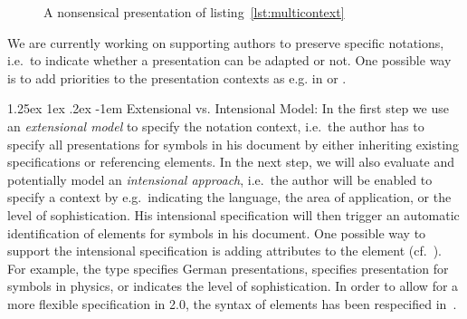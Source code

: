 \documentclass[pdftex,bibtotocnumbered,idxtotoc,11pt]{scrartcl}
\makeatletter
\renewcommand\paragraph{\@startsection{paragraph}{4}{\z@}%
{1.25ex \@plus1ex \@minus.2ex}%
{-1em}%
{\setlength{\parfillskip}{\z@ \@plus 1fil}%
\raggedsection\normalfont\sectfont\nobreak
\size@paragraph\nobreak}}
\makeatother
\begin{document}
\begin{figure}[ht]
\begin{center}
\caption{A nonsensical presentation of listing~\ref{lst:multicontext}}
\end{center}
\end{figure}
\vspace*{-.5cm} We are currently working on supporting authors to preserve specific
notations, i.e.\ to indicate whether a presentation can be adapted or not. One possible
way is to add priorities to the presentation contexts as e.g. in {\css} or {\xslt}.


\paragraph{Extensional vs. Intensional Model:} In the first step we use an
{\emph{extensional model}} to specify the notation context, i.e.\ the author has to
specify all presentations for symbols in his document by either inheriting existing
specifications or referencing {} elements. In the next step, we will
also evaluate and potentially model an {\emph{intensional approach}}, i.e.\ the author
will be enabled to specify a context by e.g.\ indicating the language, the area of
application, or the level of sophistication. His intensional specification will then
trigger an automatic identification of {} elements for symbols in
his document. One possible way to support the intensional specification is adding
{} attributes to the {} element
(cf.~\cite{ManLib:apo05}). For example, the type {}
specifies German presentations, {} specifies
presentation for symbols in physics, or {}
indicates the level of sophistication. In order to allow for a more flexible specification
in {\omdoc}2.0, the syntax of {} elements has been respecified
in~\cite{KohLanRab:pmcfe07}.


\end{document}

